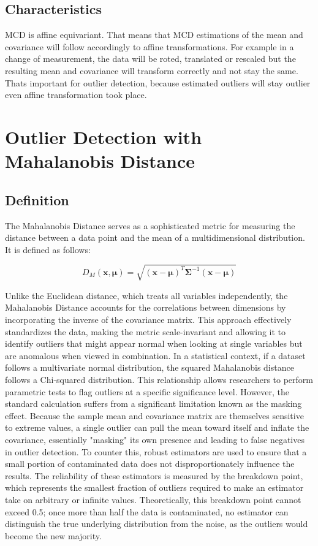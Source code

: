 \subsection*{Characteristics}

MCD is affine equivariant. That means that MCD estimations of the mean and covariance will follow accordingly to 
affine transformations. For example in a change of measurement, the data will be roted, translated or rescaled but the resulting 
mean and covariance will transform correctly and not stay the same.
Thats important for outlier detection, because estimated outliers will stay outlier even affine transformation took place. \citet{hubert2018minimum}

    
\section*{Outlier Detection with Mahalanobis Distance}
\subsection*{Definition}
The Mahalanobis Distance serves as a sophisticated metric for measuring the distance between a data point and the mean of a multidimensional distribution. 
It is defined as follows:


\begin{equation}
    D_M(\mathbf{x}, \mathbf{\mu}) = \sqrt{ (\mathbf{x} - \mathbf{\mu})^T \mathbf{\Sigma}^{-1} (\mathbf{x} - \mathbf{\mu}) }
    \label{eq:mahalanobis}
\end{equation}

Unlike the Euclidean distance, which treats all variables independently, the Mahalanobis Distance accounts for the correlations between dimensions by incorporating the inverse of the covariance matrix. 
This approach effectively standardizes the data, making the metric scale-invariant and allowing it to identify outliers that might appear normal when looking at single variables but are anomalous when viewed in combination.
In a statistical context, if a dataset follows a multivariate normal distribution, the squared Mahalanobis distance follows a Chi-squared distribution. 
This relationship allows researchers to perform parametric tests to flag outliers at a specific significance level. 
However, the standard calculation suffers from a significant limitation known as the masking effect. 
Because the sample mean and covariance matrix are themselves sensitive to extreme values, a single outlier can pull the mean toward itself and inflate the covariance, essentially "masking" its own presence and leading to false negatives in outlier detection.
To counter this, robust estimators are used to ensure that a small portion of contaminated data does not disproportionately influence the results. 
The reliability of these estimators is measured by the breakdown point, which represents the smallest fraction of outliers required to make an estimator take on arbitrary or infinite values. 
Theoretically, this breakdown point cannot exceed 0.5; once more than half the data is contaminated, no estimator can distinguish the true underlying distribution from the noise, as the outliers would become the new majority.


